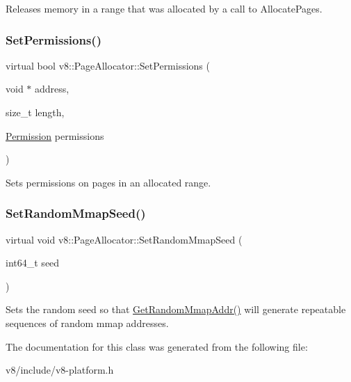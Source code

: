 Releases memory in a range that was allocated by a call to Allocate\+Pages. \mbox{\label{classv8_1_1PageAllocator_aa3817d5bfaba9ec280a6cfb60e6adda0}} 
\subsubsection{\texorpdfstring{Set\+Permissions()}{SetPermissions()}}
{\footnotesize\ttfamily virtual bool v8\+::\+Page\+Allocator\+::\+Set\+Permissions (\begin{DoxyParamCaption}\item[{void $\ast$}]{address,  }\item[{size\+\_\+t}]{length,  }\item[{\mbox{\hyperlink{classv8_1_1PageAllocator_a88f74b164fe97e053259f67a95758415}{Permission}}}]{permissions }\end{DoxyParamCaption})\hspace{0.3cm}{\ttfamily [pure virtual]}}

Sets permissions on pages in an allocated range. \mbox{\label{classv8_1_1PageAllocator_a9481a73527915fd200f6e1e9ed4b3eba}} 
\subsubsection{\texorpdfstring{Set\+Random\+Mmap\+Seed()}{SetRandomMmapSeed()}}
{\footnotesize\ttfamily virtual void v8\+::\+Page\+Allocator\+::\+Set\+Random\+Mmap\+Seed (\begin{DoxyParamCaption}\item[{int64\+\_\+t}]{seed }\end{DoxyParamCaption})\hspace{0.3cm}{\ttfamily [pure virtual]}}

Sets the random seed so that \mbox{\hyperlink{classv8_1_1PageAllocator_a37f194f9c5fdbe5105476cbd1432418c}{Get\+Random\+Mmap\+Addr()}} will generate repeatable sequences of random mmap addresses. 

The documentation for this class was generated from the following file\+:\begin{DoxyCompactItemize}
\item 
v8/include/v8-\/platform.\+h\end{DoxyCompactItemize}
